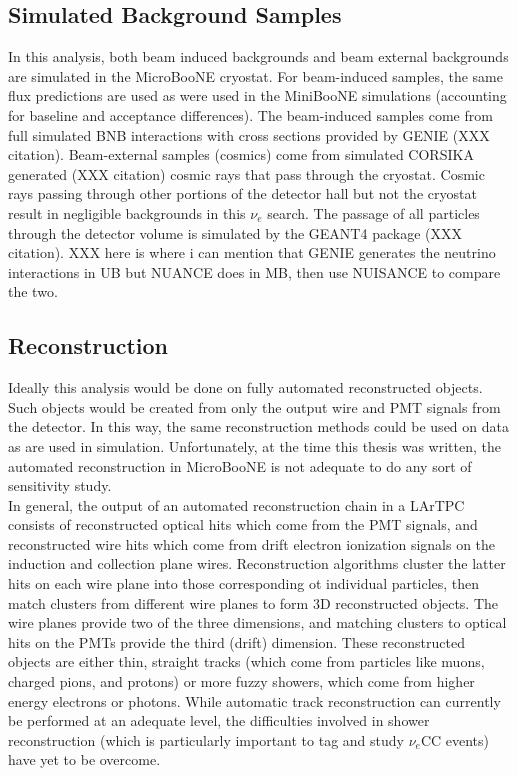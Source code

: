\subsection{Simulated Background Samples}\label{LEE_simulated_background_samples_section}
In this analysis, both beam induced backgrounds and beam external backgrounds are simulated in the MicroBooNE cryostat. For beam-induced samples, the same flux predictions are used as were used in the MiniBooNE simulations (accounting for baseline and acceptance differences). The beam-induced samples come from full simulated BNB interactions with cross sections provided by GENIE (XXX citation). Beam-external samples (cosmics) come from simulated CORSIKA generated (XXX citation) cosmic rays that pass through the cryostat. Cosmic rays passing through other portions of the detector hall but not the cryostat result in negligible backgrounds in this $\nu_e$ search. The passage of all particles through the detector volume is simulated by the {\sc GEANT4} package (XXX citation). XXX here is where i can mention that GENIE generates the neutrino interactions in UB but NUANCE does in MB, then use NUISANCE to compare the two.

\subsection{Reconstruction}
Ideally this analysis would be done on fully automated reconstructed objects. Such objects would be created from only the output wire and PMT signals from the detector. In this way, the same reconstruction methods could be used on data as are used in simulation. Unfortunately, at the time this thesis was written, the automated reconstruction in MicroBooNE is not adequate to do any sort of sensitivity study.\\

In general, the output of an automated reconstruction chain in a LArTPC consists of reconstructed optical hits which come from the PMT signals, and reconstructed wire hits which come from drift electron ionization signals on the induction and collection plane wires. Reconstruction algorithms cluster the latter hits on each wire plane into those corresponding ot individual particles, then match clusters from different wire planes to form 3D reconstructed objects. The wire planes provide two of the three dimensions, and matching clusters to optical hits on the PMTs provide the third (drift) dimension. These reconstructed objects are either thin, straight tracks (which come from particles like muons, charged pions, and protons) or more fuzzy showers, which come from higher energy electrons or photons. While automatic track reconstruction can currently be performed at an adequate level, the difficulties involved in shower reconstruction (which is particularly important to tag and study $\nu_e$CC events) have yet to be overcome.\\

